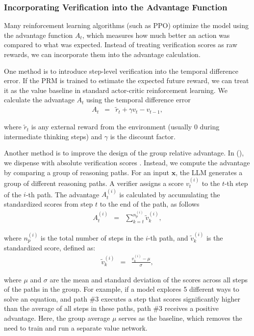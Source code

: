 \subsubsection{Incorporating Verification into the Advantage Function}

Many reinforcement learning algorithms (such as PPO) optimize the model using the advantage function $A_t$, which measures how much better an action was compared to what was expected. Instead of treating verification scores as raw rewards, we can incorporate them into the advantage calculation.

One method is to introduce step-level verification into the temporal difference error. If the PRM is trained to estimate the expected future reward, we can treat it as the value baseline in standard actor-critic reinforcement learning. We calculate the advantage $A_t$ using the temporal difference error
\begin{eqnarray}
A_t & = & \tilde{r}_{t} + \gamma v_t - v_{t-1},
\end{eqnarray}

\noindent where $\tilde{r}_{t}$ is any external reward from the environment (usually $0$ during intermediate thinking steps) and $\gamma$ is the discount factor.

Another method is to improve the design of the group relative advantage. In  (), we dispense with absolute verification scores \cite{shao-etal:2024deepseekmath}. Instead, we compute the advantage by comparing a group of reasoning paths. For an input $\mathbf{x}$, the LLM generates a group of different reasoning paths. A verifier assigns a score $v_t^{(i)}$ to the $t$-th step of the $i$-th path. The advantage $A_t^{(i)}$ is calculated by accumulating the standardized scores from step $t$ to the end of the path, as follows
\begin{eqnarray}
A_t^{(i)} & = & \sum_{k = t}^{n_p^{(i)}} \tilde{v}_k^{(i)},
\end{eqnarray}

\noindent where $n_p^{(i)}$ is the total number of steps in the $i$-th path, and $\tilde{v}_k^{(i)}$ is the standardized score, defined as:
\begin{eqnarray}
\tilde{v}_k^{(i)} & = & \frac{v_k^{(i)} - \mu}{\sigma},
\end{eqnarray}

\noindent where $\mu$ and $\sigma$ are the mean and standard deviation of the scores across all steps of the paths in the group. For example, if a model explores 5 different ways to solve an equation, and path \#3 executes a step that scores significantly higher than the average of all steps in these paths, path \#3 receives a positive advantage. Here, the group average $\mu$ serves as the baseline, which removes the need to train and run a separate value network.


